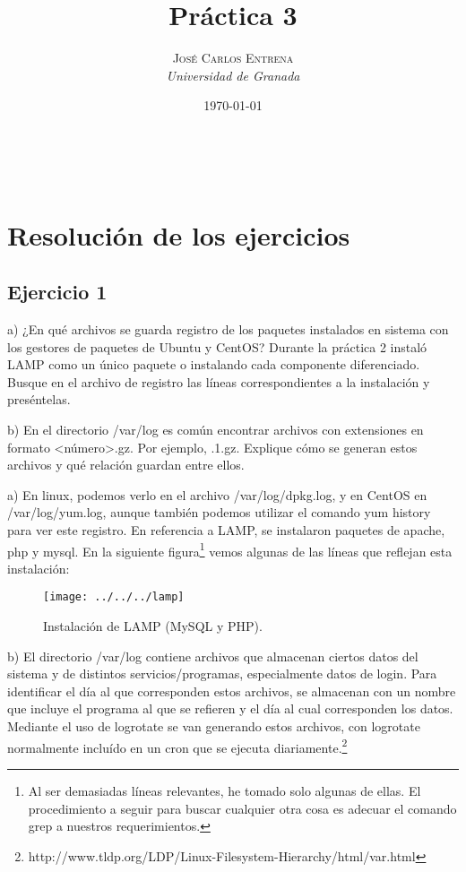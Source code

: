 \documentclass[a4paper, 11pt]{article} %
\title{\textbf{Práctica 3}\\ %
} %
\author{\textsc{José Carlos Entrena} %
\\{\textit{Universidad de Granada}}} %
\date{\today} %
\makeatletter
\renewcommand{\maketitle}{ %
\begin{flushright} %
{\LARGE\@title} %

\vspace{60pt} %

{\large\@author} %
\\\@date %

\vspace{40pt} %
\end{flushright}
}
\makeatother
\begin{document}
\maketitle %

{\parskip=2pt
  \tableofcontents
}   %

\pagebreak %

\section{Resolución de los ejercicios}

\subsection{Ejercicio 1}
a) ¿En qué archivos se guarda registro de los paquetes instalados en sistema con los gestores de paquetes de Ubuntu y CentOS? Durante la práctica 2 instaló LAMP como un único paquete o instalando cada componente diferenciado. Busque en el archivo de registro las líneas correspondientes a la instalación y preséntelas. 

b) En el directorio /var/log es común encontrar archivos con extensiones en formato <número>.gz. Por ejemplo, .1.gz. Explique cómo se generan estos archivos y qué relación guardan entre ellos. 


a) En linux, podemos verlo en el archivo /var/log/dpkg.log, y en CentOS en /var/log/yum.log, aunque también podemos utilizar el comando yum history para ver este registro. 
En referencia a LAMP, se instalaron paquetes de apache, php y mysql. En la siguiente figura\footnote{Al ser demasiadas líneas relevantes, he tomado solo algunas de ellas. El procedimiento a seguir para buscar cualquier otra cosa es adecuar el comando grep a nuestros requerimientos.} vemos algunas de las líneas que reflejan esta instalación: 

\begin{figure}[htpb]
\centering
\texttt{[image: ../../../lamp]}
\caption{Instalación de LAMP (MySQL y PHP).}
\end{figure}

b) El directorio /var/log contiene archivos que almacenan ciertos datos del sistema y de distintos servicios/programas, especialmente datos de login. Para identificar el día al que corresponden estos archivos, se almacenan con un nombre que incluye el programa al que se refieren y el día al cual corresponden los datos. Mediante el uso de logrotate se van generando estos archivos, con logrotate normalmente incluído en un cron que se ejecuta diariamente.\footnote{http://www.tldp.org/LDP/Linux-Filesystem-Hierarchy/html/var.html}
\end{document}
